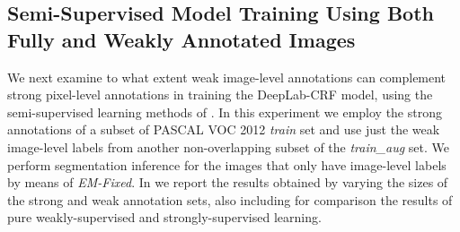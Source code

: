 \begin{table}
  \centering
  \caption{DeepLab-CRF VOC 2012 \textsl{val} performance using
    image-level weak annotations in training compared to previous methods.}
  \label{tb:weak_annot}
\end{table}




\subsection{Semi-Supervised Model Training Using Both Fully and Weakly Annotated Images}
\label{sec:test_semi}

We next examine to what extent weak image-level annotations can
complement strong pixel-level annotations in training the DeepLab-CRF
model, using the semi-supervised learning methods of
. In this experiment we employ the strong
annotations of a subset of PASCAL VOC 2012 \textsl{train} set and
use just the weak image-level labels from another non-overlapping
subset of the \textsl{train\_aug} set. We perform segmentation
inference for the images that only have image-level labels by means of
\textsl{EM-Fixed}. In  we report the 
results obtained by varying the sizes of the strong and weak
annotation sets, also including for comparison the results of pure
weakly-supervised and strongly-supervised learning.

